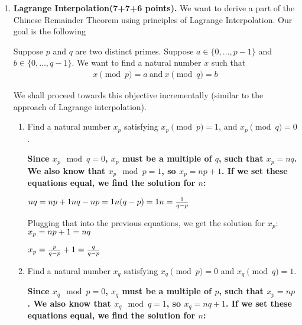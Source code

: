 \documentclass[11pt]{article}
\begin{document}
\begin{enumerate}


\item {\bfseries Lagrange Interpolation(7+7+6 points).} 
We want to derive a part of the Chinese Remainder Theorem using principles of Lagrange Interpolation. Our goal is the following 
\begin{boxedalgo}
Suppose $p$ and $q$ are two distinct primes. Suppose $a\in \{0,\ldots,p-1\}$ and $b\in \{0,\ldots,q-1 \}$. We want to find a natural number $x$ such that 
\begin{align*}
    x \pmod p =a\ \text{and}\ x\pmod q=b 
\end{align*}
\end{boxedalgo}
We shall proceed towards this objective incrementally (similar to the approach of Lagrange interpolation). 
\begin{enumerate}
    \item Find a natural number $x_p$ satisfying $x_p \pmod p = 1$, and $x_p \pmod q =0$. \newline 
    {\bfseries
    \newline
    \newline
    Since $x_p\mod q = 0$, $x_p$ must be a multiple of $q$, such that $x_p=nq$. \newline
    We also know that $x_p\mod p = 1$, so $x_p=np+1$. \newline
    If we set these equations equal, we find the solution for $n$: \newline

    $nq=np+1 \newline
    nq-np=1 \newline
    n(q-p)=1 \newline
    n=\frac{1}{q-p} \newline$

    Plugging that into the previous equations, we get the solution for $x_p$: \newline
    $x_p = np+1 = nq \newline$

    $x_p = \frac{p}{q-p} + 1 = \frac{q}{q-p} \newline$
    }
     \newpage
    \item Find a natural number $x_q$ satisfying $x_q \pmod p = 0$ and $x_q \pmod q =1$. \newline 
    {\bfseries
    \newline
    \newline
    Since $x_q\mod p = 0$, $x_q$ must be a multiple of $p$, such that $x_p=np$. \newline
    We also know that $x_q\mod q = 1$, so $x_q=nq+1$. \newline
    If we set these equations equal, we find the solution for $n$: \newline

}
\end{enumerate}
\end{enumerate}
\end{document}
